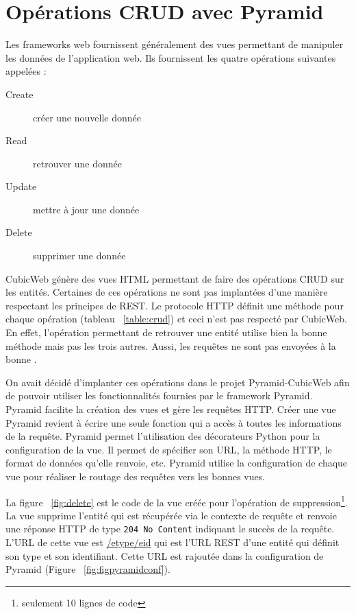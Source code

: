 \section{Opérations CRUD avec Pyramid}
Les frameworks web fournissent généralement des vues permettant de manipuler les données de l'application web. Ils fournissent les quatre opérations suivantes appelées  :
\begin{description}
    \item[Create] créer une nouvelle donnée
    \item[Read] retrouver une donnée
    \item[Update] mettre à jour une donnée
    \item[Delete] supprimer une donnée
\end{description}

CubicWeb génère des vues HTML permettant de faire des opérations CRUD sur les entités. Certaines de ces opérations ne sont pas implantées d'une manière respectant les principes de REST. Le protocole HTTP définit une méthode pour chaque opération (tableau ~\ref{table:crud}) et ceci n'est pas respecté par CubicWeb. En effet, l'opération permettant de retrouver une entité utilise bien la bonne méthode mais pas les trois autres. Aussi, les requêtes ne sont pas envoyées à la bonne .

On avait décidé d'implanter ces opérations dans le projet Pyramid-CubicWeb afin de pouvoir utiliser les fonctionnalités fournies par le framework Pyramid. Pyramid facilite la création des vues et gère les requêtes HTTP. Créer une vue Pyramid revient à écrire une seule fonction qui a accès à toutes les informations de la requête. Pyramid permet l'utilisation des décorateurs Python pour la configuration de la vue. Il permet de spécifier son URL, la méthode HTTP, le format de données qu'elle renvoie, etc. Pyramid utilise la configuration de chaque vue pour réaliser le routage des requêtes vers les bonnes vues. 

La figure ~\ref{fig:delete} est le code de la vue créée pour l'opération de suppression\footnote{seulement 10 lignes de code}. La vue supprime l'entité qui est récupérée via le contexte de requête et renvoie une réponse HTTP de type \texttt{204~No~Content} indiquant le succès de la requête. L'URL de cette vue est \url{/etype/eid} qui est l'URL REST d'une entité qui définit son type et son identifiant. Cette URL est rajoutée dans la configuration de Pyramid (Figure ~\ref{fig:figpyramidconf}).

